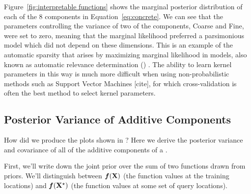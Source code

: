 Figure~\ref{fig:interpretable functions} shows the marginal posterior distribution of each of the 8 components in Equation~\eqref{eq:concrete}.
We can see that the parameters controlling the variance of two of the components, Coarse and Fine, were set to zero, meaning that the marginal likelihood preferred a parsimonious model which did not depend on these dimensions.
This is an example of the automatic sparsity that arises by maximizing marginal likelihood in \gp{} models, also known as automatic relevance determination (\ARD) \citep{neal1995bayesian}.
The ability to learn kernel parameters in this way is much more difficult when using non-probabilistic methods such as Support Vector Machines [cite], for which cross-validation is often the best method to select kernel parameters.



\subsection{Posterior Variance of Additive Components}
\label{sec:posterior-variance}

How did we produce the plots shown in ?
Here we derive the posterior variance and covariance of all of the additive components of a \gp{}.

First, we'll write down the joint prior over the sum of two functions drawn from \gp{} priors.
We'll distinguish between $\boldsymbol{f}(\mathbf{X})$ (the function values at the training locations) and  $\boldsymbol{f}(\mathbf{X}^\star)$ (the function values at some set of query locations).

